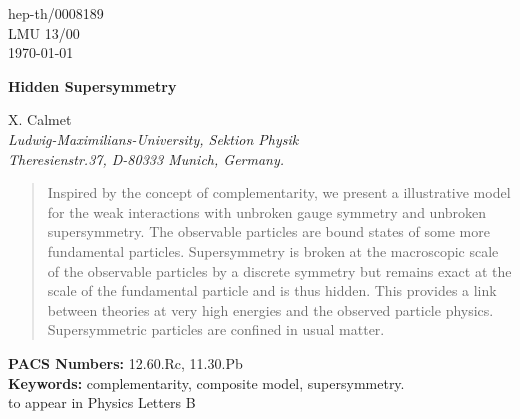 \documentclass[a4paper,12pt]{article}
\begin{document}
\makeatletter
\def\fmslash{\@ifnextchar[{\fmsl@sh}{\fmsl@sh[0mu]}}
\def\fmsl@sh[#1]#2{%
  \mathchoice
    {\@fmsl@sh\displaystyle{#1}{#2}}%
    {\@fmsl@sh\textstyle{#1}{#2}}%
    {\@fmsl@sh\scriptstyle{#1}{#2}}%
    {\@fmsl@sh\scriptscriptstyle{#1}{#2}}}
\def\@fmsl@sh#1#2#3{\m@th\ooalign{\myHighlight{$\hfil#1\mkern#2/\hfil$}\coordHE{}\crcr\myHighlight{$#1#3$}\coordHE{}}}
\makeatother
\thispagestyle{empty}
\begin{titlepage}

\begin{flushright}
hep-th/0008189 \\
LMU 13/00\\
\today
\end{flushright}

\vspace{0.3cm}
\boldmath
\begin{center}
\Large\bf Hidden Supersymmetry
\end{center}
\unboldmath
\vspace{0.8cm}

\begin{center}
  {\large X. Calmet} \\
  {\sl Ludwig-Maximilians-University, Sektion Physik} \\
  {\sl Theresienstr.37, D-80333 Munich, Germany.}
\end{center}


\vspace{\fill}

\begin{abstract}
\noindent
Inspired by the concept of complementarity, we present a illustrative
model for the weak interactions with unbroken gauge symmetry and
unbroken supersymmetry.  The observable particles are bound states of
some more fundamental particles. Supersymmetry is broken at the
macroscopic scale of the observable particles by a discrete symmetry
but remains exact at the scale of the fundamental particle and is thus
hidden.  This provides a link between theories at very high energies
and the observed particle physics. Supersymmetric particles are
confined in usual matter.
\end{abstract}
{\bf PACS Numbers: } 12.60.Rc, 11.30.Pb \\ 
{\bf Keywords: } complementarity, composite model, supersymmetry. \\
to appear in Physics Letters B 
\end{titlepage}
\end{document}
